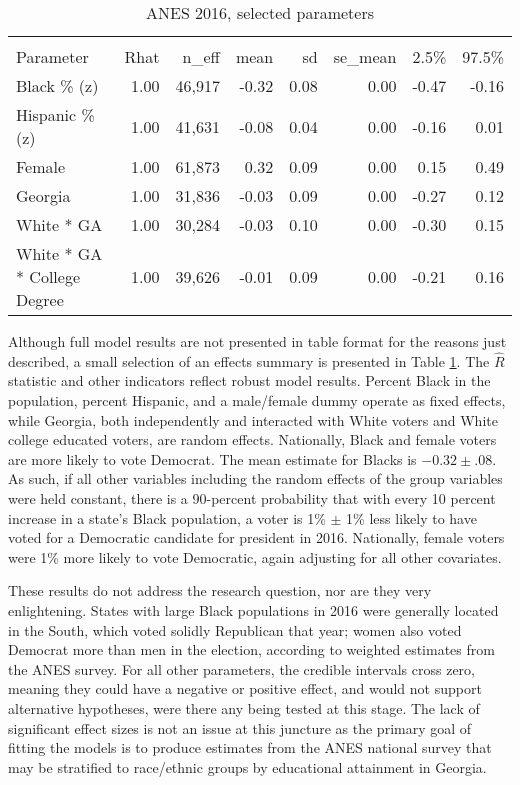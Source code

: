 \begin{table}[ht]
\centering
\begin{threeparttable}
\caption{ANES 2016, selected parameters} 
\label{tab:selpar} 
\centering
\begin{tabular}{lrrrrrrr}
  \hline \\ \vspace{0.5em}
Parameter & Rhat & n\_eff & mean & sd & se\_mean & 2.5\% & 97.5\% \\ 
  \midrule
Black \% (z) & 1.00 & 46,917 & -0.32 & 0.08 & 0.00 & -0.47 & -0.16 \\ 
  Hispanic \% (z) & 1.00 & 41,631 & -0.08 & 0.04 & 0.00 & -0.16 & 0.01 \\ 
  Female & 1.00 & 61,873 & 0.32 & 0.09 & 0.00 & 0.15 & 0.49 \\ 
  Georgia & 1.00 & 31,836 & -0.03 & 0.09 & 0.00 & -0.27 & 0.12 \\ 
  White * GA & 1.00 & 30,284 & -0.03 & 0.10 & 0.00 & -0.30 & 0.15 \\ 
  White * GA * College Degree & 1.00 & 39,626 & -0.01 & 0.09 & 0.00 & -0.21 & 0.16 \\ 
   \bottomrule
\end{tabular}
\end{threeparttable}
\end{table}


Although full model results are not presented in table format for the reasons just described, a small selection of an effects summary is presented in Table \ref{tab:selpar}. The $\hat{R}$ statistic and other indicators reflect robust model results. Percent Black in the population, percent Hispanic, and a male/female dummy operate as fixed effects, while Georgia, both independently and interacted with White voters and White college educated voters, are random effects. Nationally, Black and female voters are more likely to vote Democrat. The mean estimate for Blacks is $-0.32 \pm .08$. As such, if all other variables including the random effects of the group variables were held constant, there is a 90-percent probability that with every 10 percent increase in a state's Black population, a voter is 1\%  $\pm$ 1\%  less likely to have voted for a Democratic candidate for president in 2016. Nationally, female voters were 1\% more likely to vote Democratic, again adjusting for all other covariates. 

These results do not address the research question, nor are they very enlightening. States with large Black populations in 2016 were generally located in the South, which voted solidly Republican that year; women also voted Democrat more than men in the election, according to weighted estimates from the ANES survey. For all other parameters, the credible intervals cross zero, meaning they could have a negative or positive effect, and would not support alternative hypotheses, were there any being tested at this stage. The lack of significant effect sizes is not an issue at this juncture as the primary goal of fitting the models is to produce estimates from the ANES national survey that may be stratified to race/ethnic groups by educational attainment in Georgia. 

